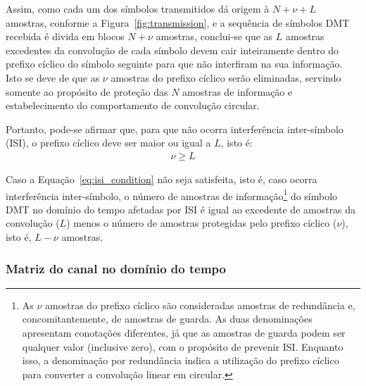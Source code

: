 Assim, como cada um dos símbolos transmitidos dá origem à $N + \nu + L$ amostras, conforme a Figura~\ref{fig:transmission}, e a sequência de símbolos DMT recebida é divida em blocos $N + \nu$ amostras, conclui-se que as $L$ amostras excedentes da convolução de cada símbolo devem cair inteiramente dentro do prefixo cíclico do símbolo seguinte para que não interfiram na sua informação. Isto se deve de que as $\nu$ amostras do prefixo cíclico serão eliminadas, servindo somente ao propósito de proteção das $N$ amostras de informação e estabelecimento do comportamento de convolução circular.

Portanto, pode-se afirmar que, para que não ocorra interferência inter-símbolo (ISI), o prefixo cíclico deve ser maior ou igual a $L$, isto é:
\begin{align}
\nu \geq L 
\label{eq:isi_condition}
\end{align}

Caso a Equação~\ref{eq:isi_condition} não seja satisfeita, isto é, caso ocorra interferência inter-símbolo, o número de amostras de informação\footnote{As $\nu$ amostras do prefixo cíclico são consideradas amostras de redundância e, concomitantemente, de amostras de guarda. As duas denominações apresentam conotações diferentes, já que as amostras de guarda podem ser qualquer valor (inclusive zero), com o propósito de prevenir ISI. Enquanto isso, a denominação por redundância indica a utilização do prefixo cíclico para converter a convolução linear em circular.} do símbolo DMT no domínio do tempo afetadas por ISI é igual ao excedente de amostras da convolução ($L$) menos o número de amostras protegidas pelo prefixo cíclico ($\nu$), isto é, $L - \nu$ amostras.

\subsubsection{Matriz do canal no domínio do tempo}

